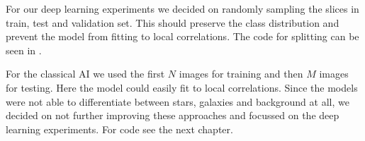 For our deep learning experiments we decided on randomly sampling the slices in train, test and validation set. This should preserve the class distribution and prevent the model from fitting to local correlations.
The code for splitting can be seen in .

For the classical AI we used the first $N$ images for training and then $M$ images for testing. Here the model could easily fit to local correlations. Since the models were not able to differentiate between stars, galaxies and background at all, we decided on not further improving these approaches and focussed on the deep learning experiments.
For code see the next chapter.

